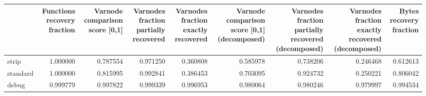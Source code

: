 \begin{tabular}{lrrrrrrrr}
\toprule
{} &  Functions recovery fraction &  Varnode comparison score [0,1] &  Varnodes fraction partially recovered &  Varnodes fraction exactly recovered &  Varnode comparison score [0,1] (decomposed) &  Varnodes fraction partially recovered (decomposed) &  Varnodes fraction exactly recovered (decomposed) &  Bytes recovery fraction \\
\midrule
strip    &                     1.000000 &                        0.787554 &                               0.971250 &                             0.360808 &                                     0.585978 &                                           0.738206 &                                          0.246468 &                 0.612613 \\
standard &                     1.000000 &                        0.815995 &                               0.992841 &                             0.386453 &                                     0.703095 &                                           0.924732 &                                          0.250221 &                 0.806042 \\
debug    &                     0.999779 &                        0.997822 &                               0.999339 &                             0.996953 &                                     0.980064 &                                           0.980246 &                                          0.979997 &                 0.994534 \\
\bottomrule
\end{tabular}
